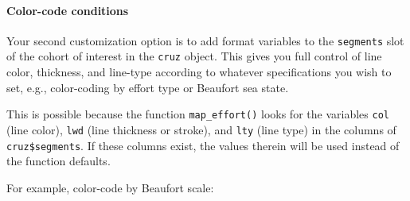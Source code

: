 \documentclass[
]{book}
\begin{document}
\hypertarget{color-code-conditions}{%
\paragraph*{Color-code conditions}\label{color-code-conditions}}

Your second customization option is to add format variables to the \texttt{segments} slot of the cohort of interest in the \texttt{cruz} object. This gives you full control of line color, thickness, and line-type according to whatever specifications you wish to set, e.g., color-coding by effort type or Beaufort sea state.

This is possible because the function \texttt{map\_effort()} looks for the variables \texttt{col} (line color), \texttt{lwd} (line thickness or stroke), and \texttt{lty} (line type) in the columns of \texttt{cruz\$segments}. If these columns exist, the values therein will be used instead of the function defaults.

For example, color-code by Beaufort scale:
\end{document}
